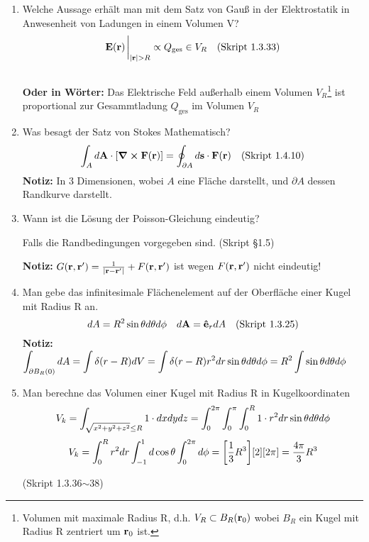 \begin{enumerate}
  \item Welche Aussage erhält man mit dem Satz von Gauß in der 
        Elektrostatik in Anwesenheit von Ladungen in einem Volumen V?
        $$\vb E(\vb r)\eval_{\abs{\vb r} > R}
          \propto Q_{\text{ges}}\in V_R
          \quad\text{(Skript 1.3.33)}$$\\
        \textbf{Oder in Wörter:} Das Elektrische Feld außerhalb 
        einem Volumen 
        $V_R$\footnote{Volumen mit 
          maximale Radius R, d.h. $V_R\subset B_R(\vb r_0)$ 
          wobei $B_R$ ein Kugel mit Radius R zentriert um $\vb r_0$ ist.}
        ist proportional zur Gesammtladung $Q_{\text{ges}}$ 
        im Volumen $V_R$

  \item Was besagt der Satz von Stokes Mathematisch?
        $$\displaystyle \int_A d\vb A \cdot \qty[\curl \vb F(\vb r)]=
         \oint_{\partial A}d\vb s\cdot \vb F(\vb r)
         \quad\text{(Skript 1.4.10)}$$
        \textbf{Notiz:} In 3 Dimensionen, wobei $A$ eine Fläche 
        darstellt,
        und $\partial A$ dessen Randkurve darstellt.

  \item Wann ist die Lösung der Poisson-Gleichung eindeutig?
        \begin{center}
          Falls die Randbedingungen vorgegeben sind. (Skript §1.5)
        \end{center}
        \textbf{Notiz:} $G(\vb r, \vb r')=\frac{1}{\abs{\vb{r}-\vb{r}'}} + F(\vb r, \vb r')$ 
        ist wegen $F(\vb r, \vb r')$ nicht eindeutig!
        
  \item Man gebe das infinitesimale Flächenelement auf der Oberfläche 
        einer Kugel mit Radius R an.
        $$\displaystyle dA = R^2\sin\theta d\theta d\phi
        \quad d\vb A = \vu e_r dA \quad\text{(Skript 1.3.25)}$$
        \textbf{Notiz:} $\displaystyle\int_{\partial B_R(0)} dA=\int\delta(r-R)dV
         =\int \delta(r-R)r^2dr\sin\theta d\theta d\phi
         =R^2 \int \sin\theta d\theta d\phi$

  \item Man berechne das Volumen einer Kugel mit Radius R 
        in Kugelkoordinaten\\
        $$\displaystyle V_k=\int_{\sqrt{x^2+y^2+z^2}\le R} 1\cdot dxdydz
         =\int_0^{2\pi}\int_0^\pi\int_0^R 1\cdot r^2dr 
          \sin\theta d\theta d\phi$$
        $$\displaystyle V_k=\int_0^R r^2 dr \int_{-1}^{1} d\cos\theta 
                 \int_0^{2\pi}d\phi
         =\qty[\frac{1}{3}R^3]\qty[2]\qty[2\pi]=\frac{4\pi}{3}R^3$$
        \begin{center}
          (Skript 1.3.36$\sim$38)
        \end{center}


\end{enumerate}
